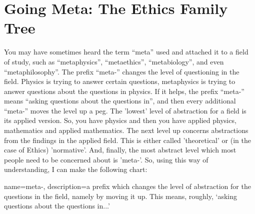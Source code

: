 \section{Going Meta: The Ethics Family Tree}  

You may have sometimes heard  the term “meta” used and attached it to a field of study, such as “metaphysics”, “metaethics”, “metabiology”, and even “metaphilosophy”. The prefix “\gls{meta-}” changes the level of questioning in the field. Physics is trying to answer certain questions, metaphysics is trying to answer questions about the questions in physics. If it helps, the prefix “meta-” means “asking questions about the questions in”, and then every additional “meta-” moves the level up a peg. The 'lowest' level of abstraction for a field is its applied version. So, you have physics and then you have applied physics, mathematics and applied mathematics. The next level up concerns abstractions from the findings in the applied field. This is either called 'theoretical' or (in the case of Ethics) 'normative'. And, finally, the most abstract level which most people need to be concerned about is 'meta-'. So, using this way of understanding, I can make the following chart: 

\begin{center}
\end{center}

{
  name=meta-,
  description={a prefix which changes the level of abstraction for the questions in the field, namely by moving it up. This means, roughly, `asking questions about the questions in...'}
}


